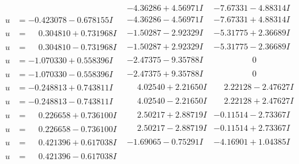 \documentclass[1p]{elsarticle_modified}
\theoremstyle{definition}
\begin{document}
$$\begin{array}{c|c|c}
 & -4.36286 + 4.56971 I & -7.67331 - 4.88314 I \\ \hline\begin{aligned}
u &= -0.423078 - 0.678155 I\end{aligned}
 & -4.36286 - 4.56971 I & -7.67331 + 4.88314 I \\ \hline\begin{aligned}
u &= \phantom{-}0.304810 + 0.731968 I\end{aligned}
 & -1.50287 - 2.92329 I & -5.31775 + 2.36689 I \\ \hline\begin{aligned}
u &= \phantom{-}0.304810 - 0.731968 I\end{aligned}
 & -1.50287 + 2.92329 I & -5.31775 - 2.36689 I \\ \hline\begin{aligned}
u &= -1.070330 + 0.558396 I\end{aligned}
 & -2.47375 - 9.35788 I & \phantom{-0.000000 } 0 \\ \hline\begin{aligned}
u &= -1.070330 - 0.558396 I\end{aligned}
 & -2.47375 + 9.35788 I & \phantom{-0.000000 } 0 \\ \hline\begin{aligned}
u &= -0.248813 + 0.743811 I\end{aligned}
 & \phantom{-}4.02540 + 2.21650 I & \phantom{-}2.22128 - 2.47627 I \\ \hline\begin{aligned}
u &= -0.248813 - 0.743811 I\end{aligned}
 & \phantom{-}4.02540 - 2.21650 I & \phantom{-}2.22128 + 2.47627 I \\ \hline\begin{aligned}
u &= \phantom{-}0.226658 + 0.736100 I\end{aligned}
 & \phantom{-}2.50217 + 2.88719 I & -0.11514 - 2.73367 I \\ \hline\begin{aligned}
u &= \phantom{-}0.226658 - 0.736100 I\end{aligned}
 & \phantom{-}2.50217 - 2.88719 I & -0.11514 + 2.73367 I \\ \hline\begin{aligned}
u &= \phantom{-}0.421396 + 0.617038 I\end{aligned}
 & -1.69065 - 0.75291 I & -4.16901 + 1.04385 I \\ \hline\begin{aligned}
u &= \phantom{-}0.421396 - 0.617038 I\end{aligned}

\end{array}$$
\end{document}
